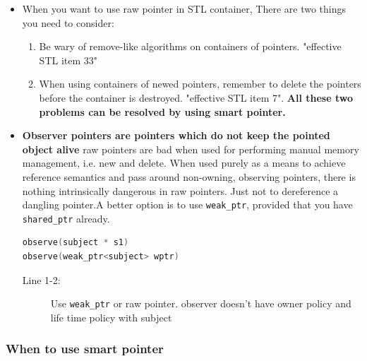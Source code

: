 \documentclass[a4paper,11pt,twoside]{book}
\begin{document}
\begin{itemize}
\item When you want to use raw pointer in STL container, There are two things you need to consider:
\begin{enumerate}
\item  Be wary of remove-like algorithms on containers of pointers. "effective STL item 33"

\item When using containers of newed pointers, remember to delete the pointers before the container is destroyed. "effective STL item 7". \textbf{All these two problems can be resolved by using smart pointer.}
\end{enumerate}

\item \textbf{Observer pointers are pointers which do not keep the pointed object alive} raw pointers are bad when used for performing manual memory management, i.e. new and delete. When used purely as a means to achieve reference semantics and pass around non-owning, observing pointers, there is nothing intrinsically dangerous in raw pointers. Just not to dereference a dangling pointer.A better option is to use \texttt{weak\_ptr}, provided that you have \texttt{shared\_ptr} already.

\begin{lstlisting}[frame=single, language=c++]
observe(subject * s1)
observe(weak_ptr<subject> wptr)
\end{lstlisting}
\begin{description}
	\item[Line 1-2:] Use \texttt{weak\_ptr} or raw pointer. observer doesn't have owner policy and life time policy with subject
\end{description}

\end{itemize}

\subsubsection{When to use smart pointer}
\end{document}
